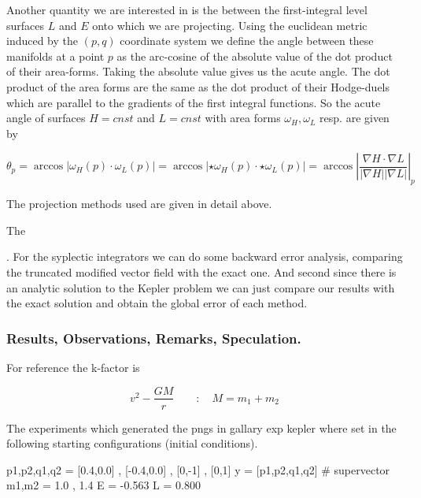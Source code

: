 \documentclass[12pt]{article}
\begin{document}
Another quantity we are interested in is the  between the first-integral level surfaces $L$ and $E$ onto which we are projecting. Using the euclidean metric induced by the $(p,q)$ coordinate system we define the angle between these manifolds at a point $p$ as the arc-cosine of the absolute value of the dot product of their area-forms. Taking the absolute value gives us the acute angle. The dot product of the area forms are the same as the dot product of their Hodge-duels which are parallel to the gradients of the first integral functions. So the acute angle of surfaces $H=cnst$ and $L=cnst$ with area forms $\omega_H,\omega_L$ resp. are given by 

\begin{equation}\label{eq:angle between level sets}
    \theta_p = \arccos{|\omega_H(p) \cdot \omega_L(p)|} = \arccos|\star \omega_H(p) \cdot \star\omega_L(p)| = \arccos\left| \frac{\nabla H \cdot \nabla L }{|\nabla H| |\nabla L|} \right|_p
\end{equation}

The projection methods used are given in detail above.

The 

. For the syplectic integrators we can do some backward error analysis, comparing the truncated modified vector field with the exact one. And second since there is an analytic solution to the Kepler problem we can just compare our results with the exact solution and obtain the global error of each method. 

\subsubsection{Results, Observations, Remarks, Speculation.}



For reference the k-factor is 

\begin{equation}
    v^2 - \frac{G M}{r}\qquad:\quad M = m_1+m_2
\end{equation}

The experiments which generated the pngs in gallary exp kepler where set in the following starting configurations (initial conditions).

\begin{python}
p1,p2,q1,q2 = [0.4,0.0] , [-0.4,0.0] , [0,-1] , [0,1]
y = [p1,p2,q1,q2] # supervector
m1,m2 = 1.0 , 1.4
E = -0.563
L = 0.800
\end{python}
\end{document}
